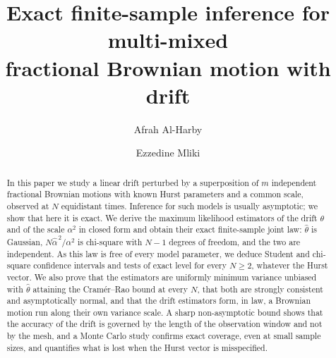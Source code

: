 \documentclass[11pt,reqno]{amsart}
\numberwithin{equation}{section}
\theoremstyle{plain}
\theoremstyle{definition}
\theoremstyle{remark}
\begin{document}
\title[Exact inference for multi-mixed fractional Brownian motion]
      {Exact finite-sample inference for multi-mixed\\
       fractional Brownian motion with drift}

\author{Afrah Al-Harby}
\address{Department of Mathematics, College of Science, Imam Abdulrahman Bin Faisal
University, P.\,O.\ Box 1982, Dammam, Saudi Arabia}

\author{Ezzedine Mliki}
\address{Department of Mathematics, College of Science, Imam Abdulrahman Bin Faisal
University, P.\,O.\ Box 1982, Dammam, Saudi Arabia}
\address{Basic and Applied Scientific Research Center, Imam Abdulrahman Bin Faisal
University, P.\,O.\ Box 1982, 31441, Dammam, Saudi Arabia}

\begin{abstract}
In this paper we study a linear drift perturbed by a superposition of $m$ independent
fractional Brownian motions with known Hurst parameters and a common scale, observed at
$N$ equidistant times. Inference for such models is usually asymptotic; we show that here
it is exact. We derive the maximum likelihood estimators of the drift $\theta$ and of the
scale $\alpha^{2}$ in closed form and obtain their exact finite-sample joint law:
$\widehat\theta$ is Gaussian, $N\widehat\alpha^{\,2}/\alpha^{2}$ is chi-square with $N-1$
degrees of freedom, and the two are independent. As this law is free of every model
parameter, we deduce Student and chi-square confidence intervals and tests of exact level
for every $N\ge2$, whatever the Hurst vector. We also prove that the estimators are
uniformly minimum variance unbiased with $\widehat\theta$ attaining the Cram\'er--Rao
bound at every $N$, that both are strongly consistent and asymptotically normal, and that
the drift estimators form, in law, a Brownian motion run along their own variance scale.
A sharp non-asymptotic bound shows that the accuracy of the drift is governed by the
length of the observation window and not by the mesh, and a Monte Carlo study confirms
exact coverage, even at small sample sizes, and quantifies what is lost when the Hurst
vector is misspecified.
\end{abstract}


\end{document}
